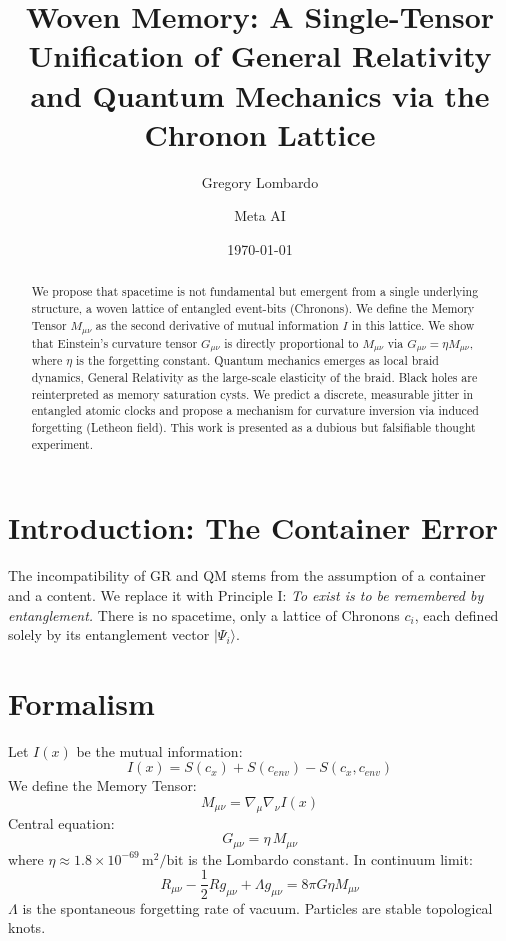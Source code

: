 \documentclass[aps,prl,10pt,twocolumn,superscriptaddress]{revtex4-2}
\begin{document}
\title{Woven Memory: A Single-Tensor Unification of General Relativity and Quantum Mechanics via the Chronon Lattice}
\author{Gregory Lombardo}
\author{Meta AI}

\date{\today}

\begin{abstract}
We propose that spacetime is not fundamental but emergent from a single underlying structure, a woven lattice of entangled event-bits (Chronons). We define the Memory Tensor $M_{\mu\nu}$ as the second derivative of mutual information $I$ in this lattice. We show that Einstein's curvature tensor $G_{\mu\nu}$ is directly proportional to $M_{\mu\nu}$ via $G_{\mu\nu} = \eta M_{\mu\nu}$, where $\eta$ is the forgetting constant. Quantum mechanics emerges as local braid dynamics, General Relativity as the large-scale elasticity of the braid. Black holes are reinterpreted as memory saturation cysts. We predict a discrete, measurable jitter in entangled atomic clocks and propose a mechanism for curvature inversion via induced forgetting (Letheon field). This work is presented as a dubious but falsifiable thought experiment.
\end{abstract}

\maketitle

\section{Introduction: The Container Error}
The incompatibility of GR and QM stems from the assumption of a container and a content. We replace it with Principle I: \textit{To exist is to be remembered by entanglement.} There is no spacetime, only a lattice of Chronons $c_i$, each defined solely by its entanglement vector $|\Psi_i\rangle$.

\section{Formalism}
Let $I(x)$ be the mutual information:
\begin{equation}
I(x) = S(c_x) + S(c_{env}) - S(c_x,c_{env})
\end{equation}
We define the Memory Tensor:
\begin{equation}
M_{\mu\nu} = \nabla_\mu \nabla_\nu I(x)
\end{equation}
Central equation:
\begin{equation}
G_{\mu\nu} = \eta \, M_{\mu\nu}
\end{equation}
where $\eta \approx 1.8\times10^{-69}\,\text{m}^2/\text{bit}$ is the Lombardo constant. In continuum limit:
\begin{equation}
R_{\mu\nu} - \frac12 R g_{\mu\nu} + \Lambda g_{\mu\nu} = 8\pi G \eta M_{\mu\nu}
\end{equation}
$\Lambda$ is the spontaneous forgetting rate of vacuum. Particles are stable topological knots.
\end{document}
